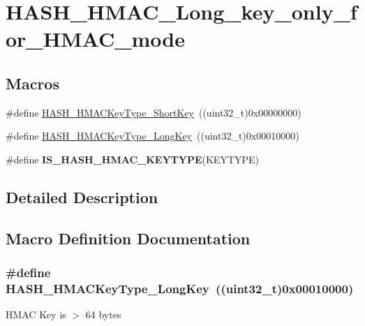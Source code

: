 \hypertarget{group___h_a_s_h___h_m_a_c___long__key__only__for___h_m_a_c__mode}{\section{H\-A\-S\-H\-\_\-\-H\-M\-A\-C\-\_\-\-Long\-\_\-key\-\_\-only\-\_\-for\-\_\-\-H\-M\-A\-C\-\_\-mode}
\label{group___h_a_s_h___h_m_a_c___long__key__only__for___h_m_a_c__mode}
}
\subsection*{Macros}
\begin{DoxyCompactItemize}
\item 
\#define \hyperlink{group___h_a_s_h___h_m_a_c___long__key__only__for___h_m_a_c__mode_ga75d858a8b5b891edc321486eebe74692}{H\-A\-S\-H\-\_\-\-H\-M\-A\-C\-Key\-Type\-\_\-\-Short\-Key}~((uint32\-\_\-t)0x00000000)
\item 
\#define \hyperlink{group___h_a_s_h___h_m_a_c___long__key__only__for___h_m_a_c__mode_ga99296878d9ed1d3ede590fdeef8f8394}{H\-A\-S\-H\-\_\-\-H\-M\-A\-C\-Key\-Type\-\_\-\-Long\-Key}~((uint32\-\_\-t)0x00010000)
\item 
\#define {\bfseries I\-S\-\_\-\-H\-A\-S\-H\-\_\-\-H\-M\-A\-C\-\_\-\-K\-E\-Y\-T\-Y\-P\-E}(K\-E\-Y\-T\-Y\-P\-E)
\end{DoxyCompactItemize}


\subsection{Detailed Description}


\subsection{Macro Definition Documentation}
\hypertarget{group___h_a_s_h___h_m_a_c___long__key__only__for___h_m_a_c__mode_ga99296878d9ed1d3ede590fdeef8f8394}{
\subsubsection[{H\-A\-S\-H\-\_\-\-H\-M\-A\-C\-Key\-Type\-\_\-\-Long\-Key}]{\setlength{\rightskip}{0pt plus 5cm}\#define H\-A\-S\-H\-\_\-\-H\-M\-A\-C\-Key\-Type\-\_\-\-Long\-Key~((uint32\-\_\-t)0x00010000)}}\label{group___h_a_s_h___h_m_a_c___long__key__only__for___h_m_a_c__mode_ga99296878d9ed1d3ede590fdeef8f8394}
H\-M\-A\-C Key is $>$ 64 bytes 


